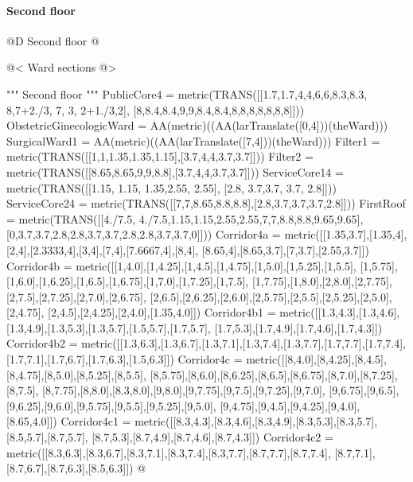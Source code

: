 \documentclass[11pt,oneside]{article}    %
\begin{document}
\paragraph{Second floor}
@D Second floor
@{
@< Ward sections @>

""" Second floor """
PublicCore4 = metric(TRANS([[1.7,1.7,4,4,6,6,8.3,8.3, 8,7+2./3, 7, 3, 2+1./3,2],
    [8,8.4,8.4,9,9,8.4,8.4,8,8,8,8,8,8,8]]))
ObstetricGinecologicWard = AA(metric)((AA(larTranslate([0,4]))(theWard)))
SurgicalWard1 = AA(metric)((AA(larTranslate([7,4]))(theWard)))
Filter1 = metric(TRANS([[1,1,1.35,1.35,1.15],[3.7,4,4,3.7,3.7]]))
Filter2 = metric(TRANS([[8.65,8.65,9,9,8.8],[3.7,4,4,3.7,3.7]]))
ServiceCore14 = metric(TRANS([[1.15, 1.15, 1.35,2.55, 2.55], [2.8, 3.7,3.7, 3.7, 2.8]]))
ServiceCore24 = metric(TRANS([[7,7,8.65,8.8,8.8],[2.8,3.7,3.7,3.7,2.8]]))
FirstRoof = metric(TRANS([[4./7.5, 4./7.5,1.15,1.15,2.55,2.55,7,7,8.8,8.8,9.65,9.65],
    [0,3.7,3.7,2.8,2.8,3.7,3.7,2.8,2.8,3.7,3.7,0]]))
Corridor4a = metric([[1.35,3.7],[1.35,4],[2,4],[2.3333,4],[3,4],[7,4],[7.6667,4],[8,4],
    [8.65,4],[8.65,3.7],[7,3.7],[2.55,3.7]])
Corridor4b = metric([[1,4.0],[1,4.25],[1,4.5],[1,4.75],[1,5.0],[1,5.25],[1,5.5],
    [1,5.75],[1,6.0],[1,6.25],[1,6.5],[1,6.75],[1,7.0],[1,7.25],[1,7.5],
    [1,7.75],[1,8.0],[2,8.0],[2,7.75],[2,7.5],[2,7.25],[2,7.0],[2,6.75],
    [2,6.5],[2,6.25],[2,6.0],[2,5.75],[2,5.5],[2,5.25],[2,5.0],[2,4.75],
    [2,4.5],[2,4.25],[2,4.0],[1.35,4.0]])
Corridor4b1 = metric([[1.3,4.3],[1.3,4.6],[1.3,4.9],[1.3,5.3],[1.3,5.7],[1.5,5.7],[1.7,5.7],
    [1.7,5.3],[1.7,4.9],[1.7,4.6],[1.7,4.3]])
Corridor4b2 = metric([[1.3,6.3],[1.3,6.7],[1.3,7.1],[1.3,7.4],[1.3,7.7],[1.7,7.7],[1.7,7.4],
    [1.7,7.1],[1.7,6.7],[1.7,6.3],[1.5,6.3]])
Corridor4c = metric([[8,4.0],[8,4.25],[8,4.5],[8,4.75],[8,5.0],[8,5.25],[8,5.5],
    [8,5.75],[8,6.0],[8,6.25],[8,6.5],[8,6.75],[8,7.0],[8,7.25],[8,7.5],
    [8,7.75],[8,8.0],[8.3,8.0],[9,8.0],[9,7.75],[9,7.5],[9,7.25],[9,7.0],
    [9,6.75],[9,6.5],[9,6.25],[9,6.0],[9,5.75],[9,5.5],[9,5.25],[9,5.0],
    [9,4.75],[9,4.5],[9,4.25],[9,4.0],[8.65,4.0]])
Corridor4c1 = metric([[8.3,4.3],[8.3,4.6],[8.3,4.9],[8.3,5.3],[8.3,5.7],[8.5,5.7],[8.7,5.7],
    [8.7,5.3],[8.7,4.9],[8.7,4.6],[8.7,4.3]])
Corridor4c2 = metric([[8.3,6.3],[8.3,6.7],[8.3,7.1],[8.3,7.4],[8.3,7.7],[8.7,7.7],[8.7,7.4],
    [8.7,7.1],[8.7,6.7],[8.7,6.3],[8.5,6.3]])
@}
\end{document}
